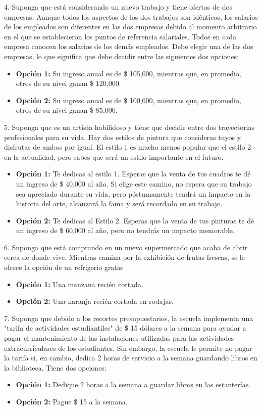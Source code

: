 \documentclass[12pt,spanish]{article}
\begin{document}
4. Suponga que está considerando un nuevo trabajo y tiene ofertas de dos empresas. Aunque todos los aspectos de los dos trabajos son idénticos, los salarios de los empleados son diferentes en las dos empresas debido al momento arbitrario en el que se establecieron los puntos de referencia salariales. Todos en cada empresa conocen los salarios de los demás empleados. Debe elegir una de las dos empresas, lo que significa que debe decidir entre las siguientes dos opciones:
\begin{itemize}
    \item \textbf{Opción 1:} Su ingreso anual es de \$ 105,000, mientras que, en promedio, otros de su nivel ganan \$ 120,000.
    \item \textbf{Opción 2:} Su ingreso anual es de \$ 100,000, mientras que, en promedio, otros de su nivel ganan \$ 85,000.
\end{itemize}


5. Suponga que es un artista habilidoso y tiene que decidir entre dos trayectorias profesionales para su vida. Hay dos estilos de pintura que consideras tuyos y disfrutas de ambos por igual. El estilo 1 es mucho menos popular que el estilo 2 en la actualidad, pero sabes que será un estilo importante en el futuro.
\begin{itemize}
    \item \textbf{Opción 1:} Te dedicas al estilo 1. Esperas que la venta de tus cuadros te dé un ingreso de \$ 40,000 al año. Si elige este camino, no espera que su trabajo sea apreciado durante su vida, pero póstumamente tendrá un impacto en la historia del arte, alcanzará la fama y será recordado en su trabajo.
    \item \textbf{Opción 2:} Te dedicas al Estilo 2. Esperas que la venta de tus pinturas te dé un ingreso de \$ 60,000 al año, pero no tendrás un impacto memorable.
\end{itemize}

6. Suponga que está comprando en un nuevo supermercado que acaba de abrir cerca de donde vive. Mientras camina por la exhibición de frutas frescas, se le ofrece la opción de un refrigerio gratis:
\begin{itemize}
    \item \textbf{Opción 1:} Una manzana recién cortada.
    \item \textbf{Opción 2:} Una naranja recién cortada en rodajas.
\end{itemize}

7. Suponga que debido a los recortes presupuestarios, la escuela implementa una "tarifa de actividades estudiantiles"  de \$ 15 dólares a la semana para ayudar a pagar el mantenimiento de las instalaciones utilizadas para las actividades extracurriculares de los estudiantes. Sin embargo, la escuela le permite no pagar la tarifa si, en cambio, dedica 2 horas de servicio a la semana guardando libros en la biblioteca. Tiene dos opciones:
\begin{itemize}
    \item \textbf{Opción 1:} Dedique 2 horas a la semana a guardar libros en las estanterías.
    \item \textbf{Opción 2:} Pague \$ 15 a la semana.
\end{itemize}
\end{document}

